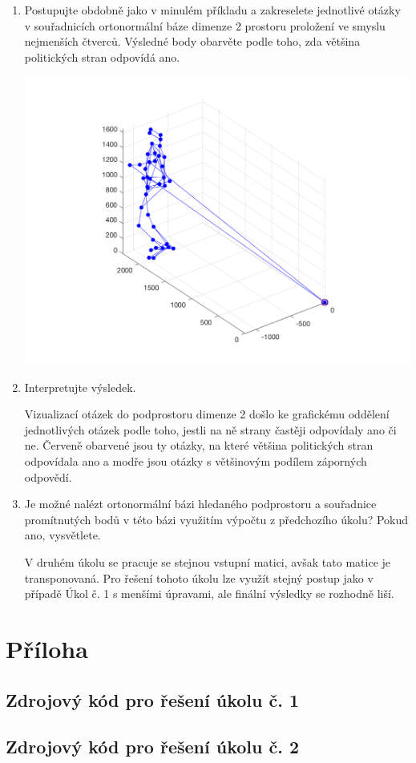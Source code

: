 \begin{enumerate}
    \item Postupujte obdobně jako v minulém příkladu a zakreselete jednotlivé otázky v sou\-řadnicích ortonormální báze dimenze 2 prostoru proložení ve smyslu nejmenších čtverců. Výsledné body obarvěte podle toho, zda většina politických stran odpovídá ano.

    \begin{center}
        \includegraphics[width=\textwidth]{../otazky.png}
    \end{center}

    \item Interpretujte výsledek.

    Vizualizací otázek do podprostoru dimenze 2 došlo ke grafickému oddělení jednotlivých otázek podle toho, jestli na ně strany častěji odpovídaly ano či ne. Červeně obarvené jsou ty otázky, na které většina politických stran odpovídala ano a modře jsou otázky s většinovým podílem záporných odpovědí.

    \item Je možné nalézt ortonormální bázi hledaného podprostoru a souřadnice promítnutých bodů v této bázi využitím výpočtu z předchozího úkolu? Pokud ano, vysvětlete.

    V druhém úkolu se pracuje se stejnou vstupní matici, avšak tato matice je transponovaná. Pro řešení tohoto úkolu lze využít stejný postup jako v případě Úkol č. 1 s menšími úpravami, ale finální výsledky se rozhodně liší.

\end{enumerate}

\newpage

\section{Příloha}

\subsection{Zdrojový kód pro řešení úkolu č. 1}



\subsection{Zdrojový kód pro řešení úkolu č. 2}


